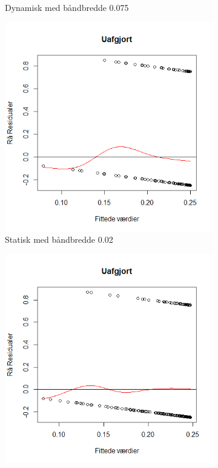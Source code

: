 \documentclass[11pt,a4paper]{article}
\begin{document}
\begin{figure}[h!]
\begin{subfigure}[b]{0.425\linewidth}
    \caption{Dynamisk med båndbredde 0.075}
    \label{fig:ResDUS}
  \end{subfigure}
  \begin{subfigure}[b]{0.425\linewidth}
    \includegraphics[width=\linewidth]{ResSU.png}
    \caption{Statisk med båndbredde 0.02}
    \label{fig:ResSU}
  \end{subfigure}
  \begin{subfigure}[b]{0.425\linewidth}
    \includegraphics[width=\linewidth]{ResDU.png}

\end{subfigure}
\end{figure}
\end{document}
